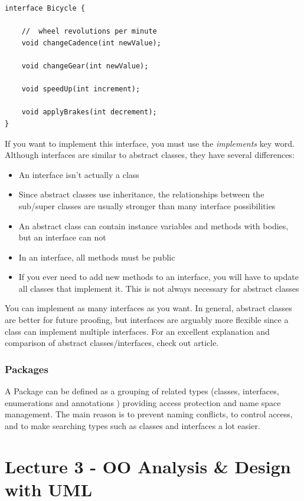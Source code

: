 \documentclass{article}
\begin{document}
\begin{lstlisting}
interface Bicycle {

    //  wheel revolutions per minute
    void changeCadence(int newValue);

    void changeGear(int newValue);

    void speedUp(int increment);

    void applyBrakes(int decrement);
}
\end{lstlisting}

If you want to implement this interface, you must use the \emph{implements} key word. Although interfaces are similar to abstract classes, they have several differences: 

\begin{itemize}
\item An interface isn't actually a class 
\item Since abstract classes use inheritance, the relationships between the sub/super classes are usually stronger than many interface possibilities
\item An abstract class can contain instance variables and methods with bodies, but an interface can not
\item In an interface, all methods must be public
\item If you ever need to add new methods to an interface, you will have to update all classes that implement it. This is not always necessary for abstract classes
\end{itemize}

You can implement as many interfaces as you want. In general, abstract classes are better for future proofing, but interfaces are arguably more flexible since a class can implement multiple interfaces. For an excellent explanation and comparison of abstract classes/interfaces, check out \href{http://www.programmerinterview.com/index.php/java-questions/interface-vs-abstract-class/}{\color{blue}{this}} article.
\newpage

\subsubsection{Packages}
A Package can be defined as a grouping of related types (classes, interfaces, enumerations and annotations ) providing access protection and name space management. The main reason is to prevent naming conflicts, to control access, and to make searching types such as classes and interfaces a lot easier.

\section{Lecture 3 - OO Analysis \& Design with UML}
\end{document}
